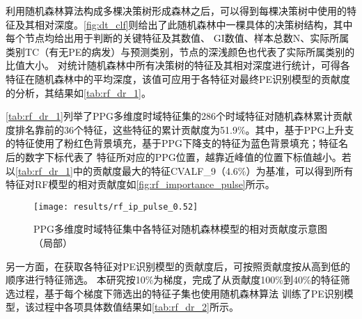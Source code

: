 \vspace{-0.8cm}

利用随机森林算法构成多棵决策树形成森林之后，可以得到每棵决策树中使用的特征及其相对深度。\autoref{fig:dt_clf}则给出了此随机森林中一棵具体的决策树结构，其中每个节点均给出用于判断的关键特征及其数值、
GI数值、样本总数N、实际所属类别TC（有无PE的病发）与预测类别，节点的深浅颜色也代表了实际所属类别的比值大小。
对统计随机森林中所有决策树的特征及其相对深度进行统计，可得各特征在随机森林中的平均深度，该值可应用于各特征对最终PE识别模型的贡献度的分析，其结果如\autoref{tab:rf_dr_1}。

\autoref{tab:rf_dr_1}列举了PPG多维度时域特征集的286个时域特征对随机森林累计贡献度排名靠前的36个特征，这些特征的累计贡献度为51.9\%。其中，基于PPG上升支的特征使用了粉红色背景填充，基于PPG下降支的特征为蓝色背景填充；特征名后的数字下标代表了
特征所对应的PPG位置，越靠近峰值的位置下标值越小。若以\autoref{tab:rf_dr_1}中的贡献度最大的特征CVALF\_9（4.6\%）为基准，可以得到所有特征对RF模型的相对贡献度如\autoref{fig:rf_importance_pulse}所示。

\begin{figure}[htbp]
      \centering
      \texttt{[image: results/rf\_ip\_pulse\_0.52]}
      \caption[PPG多维度时域特征集中各特征对随机森林模型的相对贡献度示意图（局部）]{\label{fig:rf_importance_pulse}PPG多维度时域特征集中各特征对随机森林模型的相对贡献度示意图（局部）}
\end{figure}

另一方面，在获取各特征对PE识别模型的贡献度后，可按照贡献度按从高到低的顺序进行特征筛选。
本研究按10\%为梯度，完成了从贡献度100\%到40\%的特征筛选过程，基于每个梯度下筛选出的特征子集也使用随机森林算法
训练了PE识别模型，该过程中各项具体数值结果如\autoref{tab:rf_dr_2}所示。

